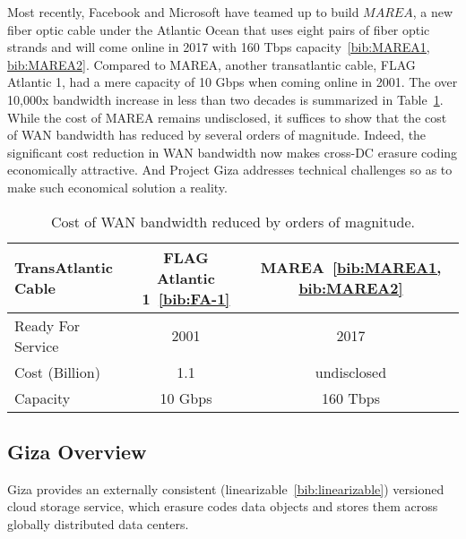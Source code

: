Most recently, Facebook and Microsoft have teamed up to build $MAREA$, a new fiber optic cable under the Atlantic Ocean that uses eight pairs of fiber optic strands and will come online in 2017 with 160 Tbps capacity~\ref{bib:MAREA1, bib:MAREA2}. Compared to MAREA, another transatlantic cable, FLAG Atlantic 1, had a mere capacity of 10 Gbps when coming online in 2001. The over 10,000x bandwidth increase in less than two decades is summarized in Table~\ref{tab:mears}. While the cost of MAREA remains undisclosed, it suffices to show that the cost of WAN bandwidth has reduced by several orders of magnitude. Indeed, the significant cost reduction in WAN bandwidth now makes cross-DC erasure coding economically attractive. And Project Giza addresses technical challenges so as to make such economical solution a reality.

\begin{table}[thp]
\centering
\begin{tabular}{|l|c|c|}
\hline
TransAtlantic Cable             & FLAG Atlantic 1~\ref{bib:FA-1}    & MAREA~\ref{bib:MAREA1, bib:MAREA2}
\\ \hline \hline
Ready For Service               & 2001                              & 2017
\\ \hline
Cost (Billion)                  & 1.1                               & undisclosed
\\ \hline
Capacity                        & 10 Gbps                           & 160 Tbps
\\ \hline \hline
\end{tabular}
\caption{Cost of WAN bandwidth reduced by orders of magnitude.}
\label{tab:mears}
\end{table}


\subsection{Giza Overview}

Giza provides an externally consistent (linearizable~\ref{bib:linearizable}) versioned cloud storage service, which erasure codes data objects and stores them across globally distributed data centers.

